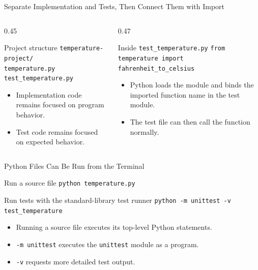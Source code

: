 \documentclass[aspectratio=169,10pt]{beamer}
\begin{document}
\begin{frame}{Separate Implementation and Tests, Then Connect Them with Import}
  \begin{columns}[T,onlytextwidth]
    \begin{column}{0.45\textwidth}
      \begin{block}{Project structure}
        \texttt{temperature-project/}\\
        \hspace*{0.18in}\texttt{temperature.py}\\
        \hspace*{0.18in}\texttt{test\_temperature.py}
      \end{block}
      \begin{itemize}
        \item Implementation code remains focused on program behavior.
        \item Test code remains focused on expected behavior.
      \end{itemize}
    \end{column}
    \begin{column}{0.47\textwidth}
      \begin{block}{Inside \texttt{test\_temperature.py}}
        \texttt{from temperature import}\\
        \hspace*{0.18in}\texttt{fahrenheit\_to\_celsius}
      \end{block}
      \begin{itemize}
        \item Python loads the module and binds the imported function name in the test module.
        \item The test file can then call the function normally.
      \end{itemize}
    \end{column}
  \end{columns}
\end{frame}

\begin{frame}{Python Files Can Be Run from the Terminal}
  \begin{block}{Run a source file}
    \texttt{python temperature.py}
  \end{block}

  \begin{block}{Run tests with the standard-library test runner}
    \texttt{python -m unittest -v test\_temperature}
  \end{block}

  \begin{itemize}
    \item Running a source file executes its top-level Python statements.
    \item \texttt{-m unittest} executes the \texttt{unittest} module as a program.
    \item \texttt{-v} requests more detailed test output.
  \end{itemize}
\end{frame}
\end{document}
